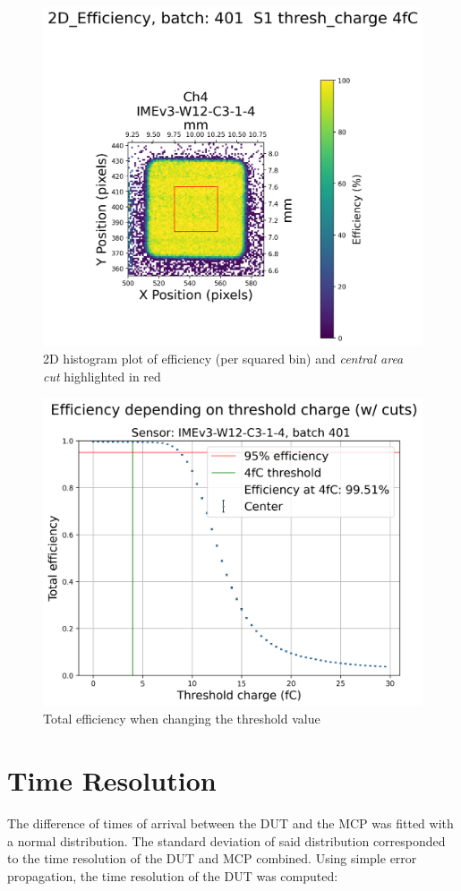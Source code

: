 \begin{figure}[!ht]
    \centering
    \includegraphics[width=0.7\linewidth]{Images/efficiency_plots/2D Efficiency_401_S1_with_center_highlight_DUTs_3.png}
    \captionsetup{width=\captionwidth}
    \caption{2D histogram plot of efficiency (per squared bin) and \textit{central area cut} highlighted in red}
    \label{fig:efficiency_2D_plot}
\end{figure}

\begin{figure}[!ht]
    \centering
    \includegraphics[width=0.5\linewidth]{Images/efficiency_plots/Efficiency depending on threshold charge (with cuts) batch 401 S1.png}
    \caption{Total efficiency when changing the threshold value}
    \label{fig:efficiency_depending_threshold}
\end{figure}


\section{Time Resolution}\label{sec:methods_time_resolution}

The difference of times of arrival between the DUT and the MCP was fitted with a normal distribution. The standard deviation of said distribution corresponded to the time resolution of the DUT and MCP combined. Using simple error propagation, the time resolution of the DUT was computed: 

